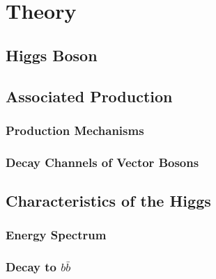 \chapter{Theory}

\section{Higgs Boson}


\section{Associated Production}

\subsection{Production Mechanisms}

\subsection{Decay Channels of Vector Bosons}

\section{Characteristics of the Higgs}

\subsection{Energy Spectrum}

\subsection{Decay to $b\bar{b}$}
